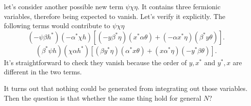 let's consider another possible new term $\psi\chi\eta$.
It contains three fermionic variables, therefore being expected to vanish.
Let's verify it explicitly.
The following terms would contribute to $\psi\chi\eta$
\[
	(-\psi \beta h^*) (- \alpha^* \chi h) \left[(-y \beta^* \eta)(x^* \alpha \theta) + (-\alpha x^* \eta)(\beta^* y \theta)\right]
.\] 
\[
	(\beta^* \psi h)(\chi \alpha h^*)\left[(\beta y^* \eta)(\alpha^* x \theta) + (x \alpha^* \eta)(-y^* \beta \theta)\right]
.\] 
It's straightforward to check they vanish because the order of $y,x^*$ and $y^*,x$ are different in the two terms.

It turns out that nothing could be generated from integrating out those variables.
Then the question is that whether the same thing hold for general $N$?
